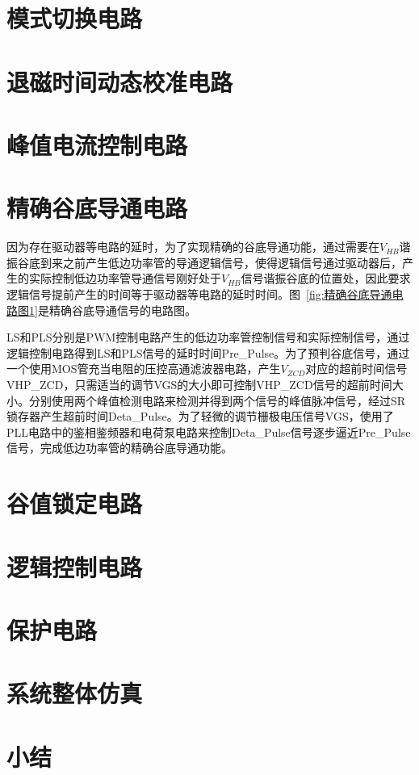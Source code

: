 \section{模式切换电路}

\section{退磁时间动态校准电路}

\section{峰值电流控制电路}


\section{精确谷底导通电路}

因为存在驱动器等电路的延时，为了实现精确的谷底导通功能，通过需要在$V_{HB}$谐振谷底到来之前产生低边功率管的导通逻辑信号，使得逻辑信号通过驱动器后，产生的实际控制低边功率管导通信号刚好处于$V_{HB}$信号谐振谷底的位置处，因此要求逻辑信号提前产生的时间等于驱动器等电路的延时时间。图~\ref{fig:精确谷底导通电路图1}是精确谷底导通信号的电路图。

LS和PLS分别是PWM控制电路产生的低边功率管控制信号和实际控制信号，通过逻辑控制电路得到LS和PLS信号的延时时间Pre\_Pulse。为了预判谷底信号，通过一个使用MOS管充当电阻的压控高通滤波器电路，产生$V_{ZCD}$对应的超前时间信号VHP\_ZCD，只需适当的调节VGS的大小即可控制VHP\_ZCD信号的超前时间大小。分别使用两个峰值检测电路来检测并得到两个信号的峰值脉冲信号，经过SR锁存器产生超前时间Deta\_Pulse。为了轻微的调节栅极电压信号VGS，使用了PLL电路中的鉴相鉴频器和电荷泵电路来控制Deta\_Pulse信号逐步逼近Pre\_Pulse信号，完成低边功率管的精确谷底导通功能。


\section{谷值锁定电路}

\section{逻辑控制电路}

\section{保护电路}

\section{系统整体仿真}

\section{小结}




